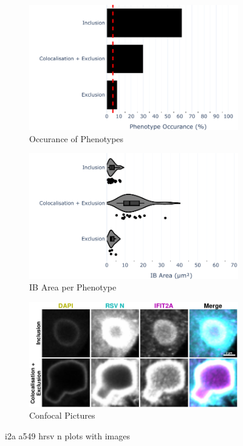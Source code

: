 \begin{figure}
    \begin{subfigure}{0.5\textwidth}
        \includegraphics[width=1\linewidth]{10. Chapter 5/Figs/01. Infection/01. IFIT2A/01. bar_i2a_a549-n.pdf} 
        \caption[]{Occurance of Phenotypes}
    \end{subfigure}
    \begin{subfigure}{0.5\textwidth}
        \includegraphics[width=1\linewidth]{10. Chapter 5/Figs/01. Infection/01. IFIT2A/02. violin_i2a_a549-n.pdf}
        \caption[]{IB Area per Phenotype}
    \end{subfigure}

    \begin{subfigure}{1\textwidth}
        \includegraphics[width=1\linewidth]{10. Chapter 5/Figs/01. Infection/01. IFIT2A/03. i2a a549 hrsv n.pdf} 
        \caption[]{Confocal Pictures}
    \end{subfigure}
    \caption[i2a a549 hrsv n plots with images]{i2a a549 hrsv n plots with images}
    \label{fig:i2a a549 hrsv n plots with images}
\end{figure}

